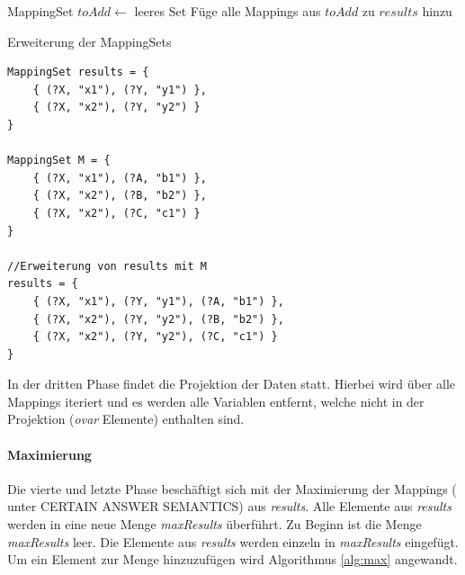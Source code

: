 \documentclass[draft,final]{vutinfth} %
\begin{document}
\begin{algorithm}
\BlankLine
MappingSet $toAdd \leftarrow$ leeres Set\;
Füge alle Mappings aus $toAdd$ zu $results$ hinzu\;
\caption{Erweiterung der MappingSets}\label{alg:erw}
\end{algorithm}

\begin{lstlisting}[float,caption={Beispiele für Erweiterung der MappingSets},frame=single,label={bspKompMap}]
MappingSet results = { 
	{ (?X, "x1"), (?Y, "y1") }, 
	{ (?X, "x2"), (?Y, "y2") } 
}

MappingSet M = { 
	{ (?X, "x1"), (?A, "b1") }, 
	{ (?X, "x2"), (?B, "b2") },
	{ (?X, "x2"), (?C, "c1") }
}

//Erweiterung von results mit M
results = { 
	{ (?X, "x1"), (?Y, "y1"), (?A, "b1") }, 
	{ (?X, "x2"), (?Y, "y2"), (?B, "b2") },
	{ (?X, "x2"), (?Y, "y2"), (?C, "c1") }
}
\end{lstlisting}

In der dritten Phase findet die Projektion der Daten statt. Hierbei wird über alle Mappings iteriert und es werden alle Variablen entfernt, welche nicht in der Projektion (\textit{ovar} Elemente) enthalten sind. 

\paragraph{Maximierung} \label{maxMapPar}
Die vierte und letzte Phase beschäftigt sich mit der Maximierung der Mappings (\cite{DBLP:conf/www/AhmetajFPSS15} unter CERTAIN ANSWER SEMANTICS) aus \textit{results}. Alle Elemente aus \textit{results} werden in eine neue Menge \textit{maxResults} überführt. Zu Beginn ist die Menge \textit{maxResults} leer. Die Elemente aus \textit{results} werden einzeln in \textit{maxResults} eingefügt. Um ein Element zur Menge hinzuzufügen wird Algorithmus \ref{alg:max} angewandt.
\end{document}
